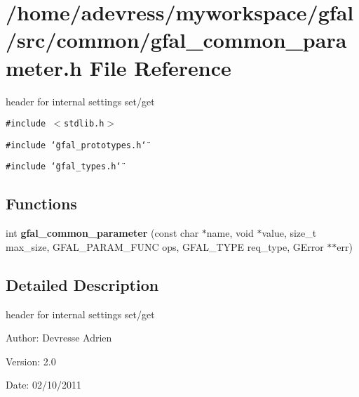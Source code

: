 \section{/home/adevress/myworkspace/gfal/src/common/gfal\_\-common\_\-parameter.h File Reference}
\label{gfal__common__parameter_8h}
header for internal settings set/get 

{\tt \#include $<$stdlib.h$>$}\par
{\tt \#include \char`\"{}gfal\_\-prototypes.h\char`\"{}}\par
{\tt \#include \char`\"{}gfal\_\-types.h\char`\"{}}\par
\subsection*{Functions}
\begin{CompactItemize}
\item 
int \textbf{gfal\_\-common\_\-parameter} (const char $\ast$name, void $\ast$value, size\_\-t max\_\-size, GFAL\_\-PARAM\_\-FUNC ops, GFAL\_\-TYPE req\_\-type, GError $\ast$$\ast$err)\label{gfal__common__parameter_8h_868b0b6b628b4f7b1cd09bd41522a4a2}

\end{CompactItemize}


\subsection{Detailed Description}
header for internal settings set/get 

\begin{Desc}
\item[Author:]Devresse Adrien \end{Desc}
\begin{Desc}
\item[Version:]2.0 \end{Desc}
\begin{Desc}
\item[Date:]02/10/2011 \end{Desc}
